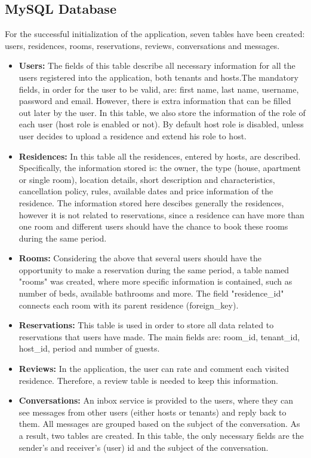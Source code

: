 \documentclass[12pt]{article}
\begin{document}
	\subsection{MySQL Database}
	
	For the successful initialization of the application, seven tables have been created: users, residences, rooms, reservations, reviews, conversations and messages. 
	
	\begin{itemize}
		
		\item \textbf{Users:} The fields of this table describe all necessary information for all the users registered into the application, both tenants and hosts.The mandatory fields, in order for the user to be valid, are: first name, last name, username, password and email. However, there is extra information that can be filled out later by the user. In this table, we also store the information of the role of each user (host role is enabled or not). By default host role is disabled, unless user decides to upload a residence and extend his role to host.
		\item \textbf{Residences:} In this table all the residences, entered by hosts, are described. Specifically, the information stored is: the owner, the type (house, apartment or single room), location details, short description and characteristics, cancellation policy, rules, available dates and price information of the residence. The information stored here descibes generally the residences, however it is not related to reservations, since a residence can have more than one room and different users should have the chance to book these rooms during the same period.
		\item \textbf{Rooms:} Considering the above that several users should have the opportunity to make a reservation during the same period, a table named "rooms" was created, where more specific information is contained, such as number of beds, available bathrooms and more. The field "residence\_id" connects each room with its parent residence (foreign\_key).
		\item \textbf{Reservations:} This table is used in order to store all data related to reservations that users have made. The main fields are: room\_id, tenant\_id, host\_id, period and number of guests.
		\item \textbf{Reviews:} In the application, the user can rate and comment each visited residence. Therefore, a review table is needed to keep this information.
		\item \textbf{Conversations:} An inbox service is provided to the users, where they can see messages from other users (either hosts or tenants) and reply back to them. All messages are grouped based on the subject of the conversation. As a result, two tables are created. In this table, the only necessary fields are the sender's and receiver's (user) id and the subject of the conversation.

\end{itemize}
\end{document}
